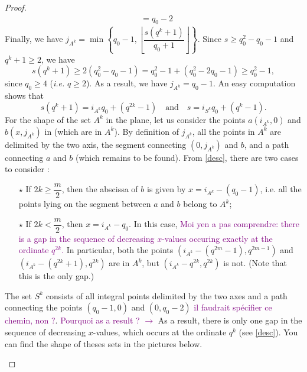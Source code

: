 \documentclass[a4paper]{article}
\newcommand\jade[1]{\textcolor{purple}{#1}}
\begin{document}
\begin{proof}
\begin{align*}
            &= q_0-2
\end{align*}
Finally, we have $j_{A^k} = \min \left\{ q_0-1, \left\lfloor \dfrac{s(q^k+1)}{q_0+1} \right\rfloor \right\}$. Since $s \geq q_0^2 - q_0 -1$ and $q^k+1 \geq 2$, we have
\begin{equation} \label{desc}
s(q^k+1) \geq 2(q_0^2-q_0-1) = q_0^2 - 1 + (q_0^2-2q_0-1) \geq q_0^2-1,
\end{equation}
since $q_0 \geq 4$ (\emph{i.e.} $q \geq 2$). As a result, we have $j_{A^k} = q_0-1$. 
An easy computation shows that 
\[s(q^k+1) = i_{A^k}q_0+(q^{2k}-1) \quad \mathrm{and} \quad s=i_{S^k}q_0 + (q^k-1).\]
For the shape of the set $A^k$ in the plane, let us consider the points $a(i_{A^k},0)$ and $b(x,j_{A^k})$ in  (which are in $A^k$). By definition of $j_{A^k}$, all the points in $A^k$ are delimited by the two axis, the segment connecting $(0,j_{A^k})$ and $b$, and a path connecting $a$ and $b$ (which remains to be found). From \eqref{desc}, there are two cases to consider :  
\begin{enumerate}
    \item[$\star$] If $2k \geq \dfrac{m}{2}$, then the abscissa of $b$ is given by $x=i_{A^k}-(q_0-1)$, i.e. all the points lying on the segment between $a$ and $b$ belong to $A^k$;
    \item[$\star$] If $2k < \dfrac{m}{2}$, then $x=i_{A^k}-q_0$. In this case, \jade{Moi yen a pas comprendre: there is a gap in the sequence of decreasing $x$-values occuring exactly at the ordinate $q^{2k}$.} In particular, both the points $(i_{A^k}-(q^{2m}-1),q^{2m-1})$ and $(i_{A^k}-(q^{2k}+1),q^{2k})$ are in $A^k$, but $(i_{A^k}-q^{2k},q^{2k})$ is not. (Note that this is the only gap.)
\end{enumerate}
The set $S^k$ consists of all integral points delimited by the two axes and a path connecting the points $(q_0-1,0)$ and $(0,q_0-2)$ \jade{il faudrait spécifier ce chemin, non ?}. \jade{Pourquoi as a result ? $\rightarrow$} As a result, there is only one gap in the sequence of decreasing $x$-values, which occurs at the ordinate $q^k$ (see \eqref{desc}). You can find the shape of theses sets in the pictures below.

\vspace*{0.3cm}
\begin{figure}[h]
\begin{center}
\end{center}
\end{figure}
\end{proof}
\end{document}
